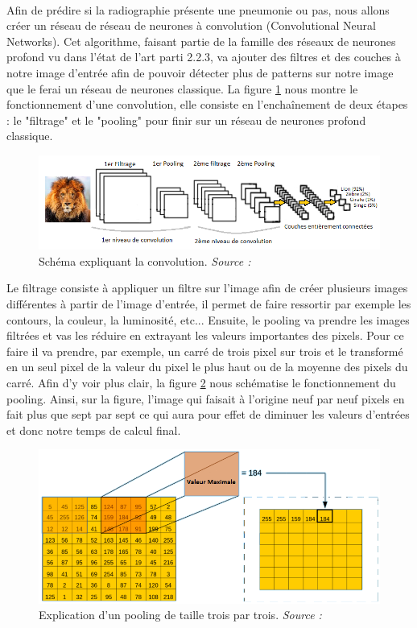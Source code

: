 \paragraph{}Afin de prédire si la radiographie présente une pneumonie ou pas, nous allons créer un réseau de réseau de neurones à convolution (Convolutional Neural Networks). Cet algorithme, faisant partie de la famille des réseaux de neurones profond vu dans l'état de l'art parti 2.2.3, va ajouter des filtres et des couches à notre image d'entrée afin de pouvoir détecter plus de patterns sur notre image que le ferai un réseau de neurones classique. La figure \ref{CNNExplain} nous montre le fonctionnement d'une convolution, elle consiste en l'enchaînement de deux étapes : le "filtrage" et le "pooling" pour finir sur un réseau de neurones profond classique.
\begin{figure}[h]
    \includegraphics[scale=0.7]{src_img/CNNExplain.png}
    \caption{Schéma expliquant la convolution. \textit{Source : \cite{CnnExplainArticle}}}
    \label{CNNExplain}
\end{figure}

Le filtrage consiste à appliquer un filtre sur l'image afin de créer plusieurs images différentes à partir de l'image d'entrée, il permet de faire ressortir par exemple les contours, la couleur, la luminosité, etc... Ensuite, le pooling va prendre les images filtrées et vas les réduire en extrayant les valeurs importantes des pixels. Pour ce faire il va prendre, par exemple, un carré de trois pixel sur trois et le transformé en un seul pixel de la valeur du pixel le plus haut ou de la moyenne des pixels du carré. Afin d'y voir plus clair, la figure \ref{CNNpooling} nous schématise le fonctionnement du pooling. Ainsi, sur la figure, l'image qui faisait à l'origine neuf par neuf pixels en fait plus que sept par sept ce qui aura pour effet de diminuer les valeurs d'entrées et donc notre temps de calcul final.

\begin{figure}[h]
    \includegraphics[scale=0.5]{src_img/CNNpooling.png}
    \caption{Explication d'un pooling de taille trois par trois. \textit{Source : \cite{CnnExplainArticle}}}
    \label{CNNpooling}
\end{figure}

